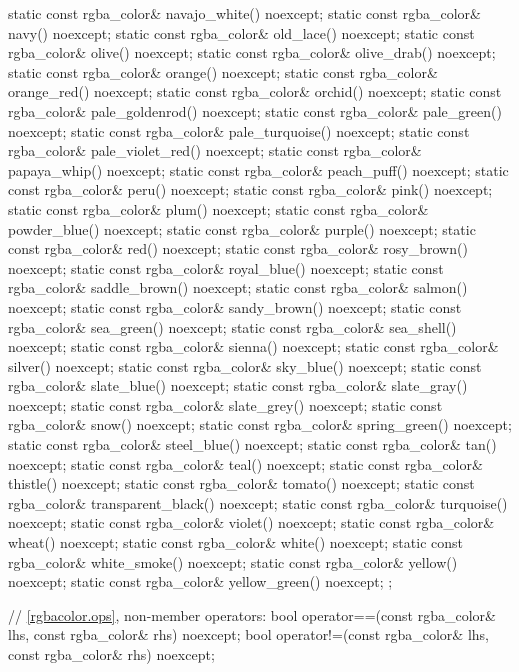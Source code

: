 \begin{codeblock}
{{{{{    static const rgba_color& navajo_white() noexcept;
    static const rgba_color& navy() noexcept;
    static const rgba_color& old_lace() noexcept;
    static const rgba_color& olive() noexcept;
    static const rgba_color& olive_drab() noexcept;
    static const rgba_color& orange() noexcept;
    static const rgba_color& orange_red() noexcept;
    static const rgba_color& orchid() noexcept;
    static const rgba_color& pale_goldenrod() noexcept;
    static const rgba_color& pale_green() noexcept;
    static const rgba_color& pale_turquoise() noexcept;
    static const rgba_color& pale_violet_red() noexcept;
    static const rgba_color& papaya_whip() noexcept;
    static const rgba_color& peach_puff() noexcept;
    static const rgba_color& peru() noexcept;
    static const rgba_color& pink() noexcept;
    static const rgba_color& plum() noexcept;
    static const rgba_color& powder_blue() noexcept;
    static const rgba_color& purple() noexcept;
    static const rgba_color& red() noexcept;
    static const rgba_color& rosy_brown() noexcept;
    static const rgba_color& royal_blue() noexcept;
    static const rgba_color& saddle_brown() noexcept;
    static const rgba_color& salmon() noexcept;
    static const rgba_color& sandy_brown() noexcept;
    static const rgba_color& sea_green() noexcept;
    static const rgba_color& sea_shell() noexcept;
    static const rgba_color& sienna() noexcept;
    static const rgba_color& silver() noexcept;
    static const rgba_color& sky_blue() noexcept;
    static const rgba_color& slate_blue() noexcept;
    static const rgba_color& slate_gray() noexcept;
    static const rgba_color& slate_grey() noexcept;
    static const rgba_color& snow() noexcept;
    static const rgba_color& spring_green() noexcept;
    static const rgba_color& steel_blue() noexcept;
    static const rgba_color& tan() noexcept;
    static const rgba_color& teal() noexcept;
    static const rgba_color& thistle() noexcept;
    static const rgba_color& tomato() noexcept;
    static const rgba_color& transparent_black() noexcept;
    static const rgba_color& turquoise() noexcept;
    static const rgba_color& violet() noexcept;
    static const rgba_color& wheat() noexcept;
    static const rgba_color& white() noexcept;
    static const rgba_color& white_smoke() noexcept;
    static const rgba_color& yellow() noexcept;
    static const rgba_color& yellow_green() noexcept;
  };

  // \ref{rgbacolor.ops}, non-member operators:
  bool operator==(const rgba_color& lhs, const rgba_color& rhs) noexcept;
  bool operator!=(const rgba_color& lhs, const rgba_color& rhs) noexcept;
} } } }
\end{codeblock}

